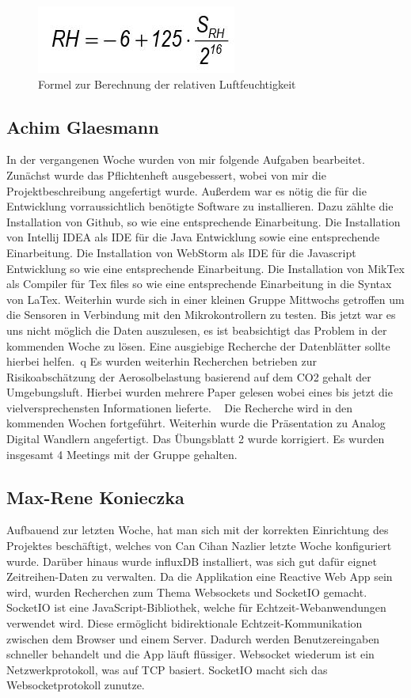 \documentclass[]{article}
\begin{document}
\begin{figure}[h]
	\centering
	\includegraphics[scale=0.60]{images/sht21_rhformula}
	\caption{Formel zur Berechnung der relativen Luftfeuchtigkeit~\cite{datasheetsht21}}
	\label{img:sht21_rhformula}
\end{figure}

\subsection{Achim Glaesmann}
In der vergangenen Woche wurden von mir folgende Aufgaben bearbeitet. Zunächst wurde das Pflichtenheft ausgebessert, wobei von mir die Projektbeschreibung angefertigt wurde.
Außerdem war es nötig die für die Entwicklung vorraussichtlich benötigte Software zu installieren. 
Dazu zählte die Installation von Github, so wie eine entsprechende Einarbeitung. Die Installation von Intellij IDEA als IDE für die Java Entwicklung sowie eine entsprechende Einarbeitung.
Die Installation von WebStorm als IDE für die Javascript Entwicklung so wie eine entsprechende Einarbeitung. Die Installation von MikTex als Compiler für Tex files so wie eine entsprechende 
Einarbeitung in die Syntax von LaTex. Weiterhin wurde sich in einer kleinen Gruppe Mittwochs getroffen um die Sensoren in Verbindung mit den Mikrokontrollern zu testen. Bis 
jetzt war es uns nicht möglich die Daten auszulesen, es ist beabsichtigt das Problem in der kommenden Woche zu lösen. Eine ausgiebige Recherche der Datenblätter sollte hierbei
helfen.~\cite{datasheetsht21}q Es wurden weiterhin Recherchen betrieben zur Risikoabschätzung der Aerosolbelastung basierend auf dem CO2 gehalt der Umgebungsluft. Hierbei wurden mehrere Paper gelesen wobei 
eines bis jetzt die vielversprechensten Informationen lieferte. ~\cite{co2letter} Die Recherche wird in den kommenden Wochen fortgeführt. Weiterhin wurde die Präsentation zu Analog Digital Wandlern 
angefertigt. Das Übungsblatt 2 wurde korrigiert. Es wurden insgesamt 4 Meetings mit der Gruppe gehalten.

\subsection{Max-Rene Konieczka}
Aufbauend zur letzten Woche, hat man sich mit der korrekten Einrichtung des Projektes beschäftigt, welches von Can Cihan Nazlier letzte Woche konfiguriert wurde. Darüber hinaus wurde influxDB installiert, was sich gut dafür eignet Zeitreihen-Daten zu verwalten. Da die Applikation eine Reactive Web App sein wird, wurden Recherchen zum Thema Websockets und SocketIO gemacht. SocketIO ist eine JavaScript-Bibliothek, welche für Echtzeit-Webanwendungen verwendet wird. Diese ermöglicht bidirektionale Echtzeit-Kommunikation zwischen dem Browser und einem Server. Dadurch werden Benutzereingaben schneller behandelt und die App läuft flüssiger. Websocket wiederum ist ein Netzwerkprotokoll, was auf TCP basiert. SocketIO macht sich das Websocketprotokoll zunutze.
\end{document}

